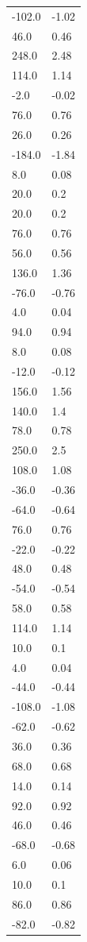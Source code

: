 \begin{longtable}{ll}
-102.0 & -1.02 \\
46.0 & 0.46 \\
248.0 & 2.48 \\
114.0 & 1.14 \\
-2.0 & -0.02 \\
76.0 & 0.76 \\
26.0 & 0.26 \\
-184.0 & -1.84 \\
8.0 & 0.08 \\
20.0 & 0.2 \\
20.0 & 0.2 \\
76.0 & 0.76 \\
56.0 & 0.56 \\
136.0 & 1.36 \\
-76.0 & -0.76 \\
4.0 & 0.04 \\
94.0 & 0.94 \\
8.0 & 0.08 \\
-12.0 & -0.12 \\
156.0 & 1.56 \\
140.0 & 1.4 \\
78.0 & 0.78 \\
250.0 & 2.5 \\
108.0 & 1.08 \\
-36.0 & -0.36 \\
-64.0 & -0.64 \\
76.0 & 0.76 \\
-22.0 & -0.22 \\
48.0 & 0.48 \\
-54.0 & -0.54 \\
58.0 & 0.58 \\
114.0 & 1.14 \\
10.0 & 0.1 \\
4.0 & 0.04 \\
-44.0 & -0.44 \\
-108.0 & -1.08 \\
-62.0 & -0.62 \\
36.0 & 0.36 \\
68.0 & 0.68 \\
14.0 & 0.14 \\
92.0 & 0.92 \\
46.0 & 0.46 \\
-68.0 & -0.68 \\
6.0 & 0.06 \\
10.0 & 0.1 \\
86.0 & 0.86 \\
-82.0 & -0.82 \\

\end{longtable}
